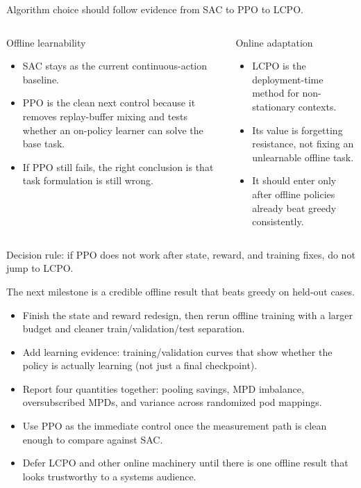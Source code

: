 \documentclass[11pt,aspectratio=43]{beamer}
\begin{document}
\begin{frame}{Algorithm choice should follow evidence from SAC to PPO to LCPO.}
  \begin{columns}[T,onlytextwidth]
      \begin{block}{Offline learnability}
        \begin{itemize}
          \item SAC stays as the current continuous-action baseline.
          \item PPO is the clean next control because it removes replay-buffer mixing and tests whether an on-policy learner can solve the base task.
          \item If PPO still fails, the right conclusion is that task formulation is still wrong.
        \end{itemize}
      \end{block}
      \begin{block}{Online adaptation}
        \begin{itemize}
          \item LCPO is the deployment-time method for non-stationary contexts.
          \item Its value is forgetting resistance, not fixing an unlearnable offline task.
          \item It should enter only after offline policies already beat greedy consistently.
        \end{itemize}
      \end{block}
  \end{columns}

  \vspace{0.3em}
  \alert{Decision rule:} if PPO does not work after state, reward, and training fixes, do not jump to LCPO.
\end{frame}

\begin{frame}{The next milestone is a credible offline result that beats greedy on held-out cases.}
  \begin{itemize}
    \item Finish the state and reward redesign, then rerun offline training with a larger budget and cleaner train/validation/test separation.
    \item Add learning evidence: training/validation curves that show whether the policy is actually learning (not just a final checkpoint).
    \item Report four quantities together: pooling savings, MPD imbalance, oversubscribed MPDs, and variance across randomized pod mappings.
    \item Use PPO as the immediate control once the measurement path is clean enough to compare against SAC.
    \item Defer LCPO and other online machinery until there is one offline result that looks trustworthy to a systems audience.
  \end{itemize}
\end{frame}
\end{document}
